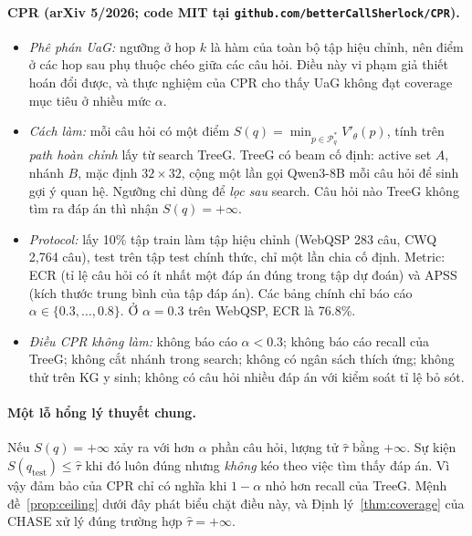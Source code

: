 \documentclass[11pt,a4paper]{article}
\theoremstyle{remark}
\newcommand{\tauhat}{\hat{\tau}}
\newcommand{\method}{\textsc{CHASE}}
\begin{document}
\paragraph{CPR \cite{cpr} (arXiv 5/2026; code MIT tại \texttt{github.com/betterCallSherlock/CPR}).}
\begin{itemize}[nosep]
  \item \emph{Phê phán UaG:} ngưỡng ở hop $k$ là hàm của toàn bộ tập hiệu chỉnh, nên điểm ở các hop sau phụ thuộc chéo giữa các câu hỏi. Điều này vi phạm giả thiết hoán đổi được, và thực nghiệm của CPR cho thấy UaG không đạt coverage mục tiêu ở nhiều mức $\alpha$.
  \item \emph{Cách làm:} mỗi câu hỏi có một điểm $S(q)=\min_{p\in\mathcal{P}^*_q}V'_\theta(p)$, tính trên \emph{path hoàn chỉnh} lấy từ search TreeG. TreeG có beam cố định: active set $A$, nhánh $B$, mặc định $32\times 32$, cộng một lần gọi Qwen3-8B mỗi câu hỏi để sinh gợi ý quan hệ. Ngưỡng chỉ dùng để \emph{lọc sau} search. Câu hỏi nào TreeG không tìm ra đáp án thì nhận $S(q)=+\infty$.
  \item \emph{Protocol:} lấy 10\% tập train làm tập hiệu chỉnh (WebQSP 283 câu, CWQ 2{,}764 câu), test trên tập test chính thức, chỉ một lần chia cố định. Metric: ECR (tỉ lệ câu hỏi có ít nhất một đáp án đúng trong tập dự đoán) và APSS (kích thước trung bình của tập đáp án). Các bảng chính chỉ báo cáo $\alpha\in\{0.3,\dots,0.8\}$. Ở $\alpha=0.3$ trên WebQSP, ECR là 76.8\%.
  \item \emph{Điều CPR không làm:} không báo cáo $\alpha<0.3$; không báo cáo recall của TreeG; không cắt nhánh trong search; không có ngân sách thích ứng; không thử trên KG y sinh; không có câu hỏi nhiều đáp án với kiểm soát tỉ lệ bỏ sót.
\end{itemize}

\paragraph{Một lỗ hổng lý thuyết chung.} Nếu $S(q)=+\infty$ xảy ra với hơn $\alpha$ phần câu hỏi, lượng tử $\tauhat$ bằng $+\infty$. Sự kiện $S(q_{\mathrm{test}})\le\tauhat$ khi đó luôn đúng nhưng \emph{không} kéo theo việc tìm thấy đáp án. Vì vậy đảm bảo của CPR chỉ có nghĩa khi $1-\alpha$ nhỏ hơn recall của TreeG. Mệnh đề~\ref{prop:ceiling} dưới đây phát biểu chặt điều này, và Định lý~\ref{thm:coverage} của \method{} xử lý đúng trường hợp $\tauhat=+\infty$.
\end{document}
